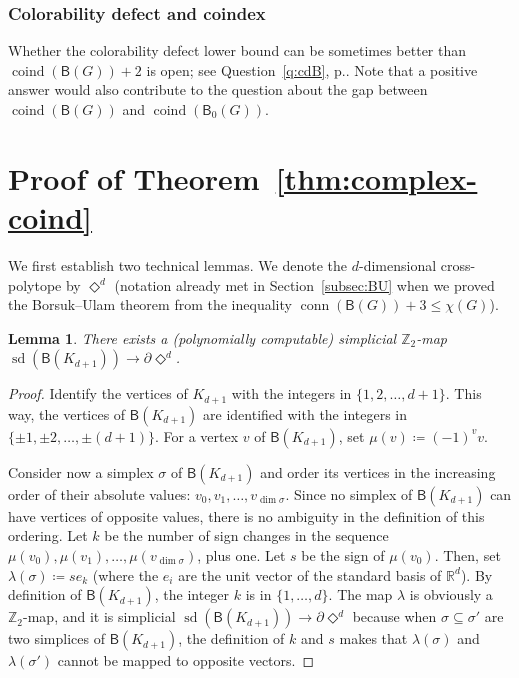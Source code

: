 \documentclass[12pt]{amsart}
\newtheorem{lemma}[theorem]{Lemma}
\theoremstyle{definition}
\def\R{\mathbb{R}}
\def\Z{\mathbb{Z}}
\def\B{\mathsf{B}}
\renewcommand{\leq}{\leqslant}
\def\conn{\operatorname{conn}}
\def\coind{\operatorname{coind}}
\def\sd{\operatorname{sd}}
\begin{document}
\subsubsection*{Colorability defect and coindex} Whether the colorability defect lower bound can be sometimes better than $\coind(\B(G))+2$ is open; see Question~\ref{q:cdB}, p.\pageref{page:cdB}. Note that a positive answer would also contribute to the question about the gap between $\coind(\B(G))$ and $\coind(\B_0(G))$.











\appendix

\section{Proof of Theorem~\ref{thm:complex-coind}}

We first establish two technical lemmas. We denote the $d$-dimensional cross-polytope by $\Diamond^d$ (notation already met in Section~\ref{subsec:BU} when we proved the Borsuk--Ulam theorem from the inequality $\conn(\B(G))+3\leq\chi(G)$).

\begin{lemma}\label{lem:bk}
There exists a (polynomially computable) simplicial $\Z_2$-map $\sd(\B(K_{d+1})) \rightarrow \partial \Diamond^d$. 
\end{lemma}

\begin{proof}
    Identify the vertices of $K_{d+1}$ with the integers in $\{1,2,\ldots,d+1\}$. This way, the vertices of $\B(K_{d+1})$ are identified with the integers in $\{\pm 1,\pm 2,\ldots,\pm (d+1)\}$. For a vertex $v$ of $\B(K_{d+1})$, set $\mu(v) \coloneqq (-1)^vv$.

    Consider now a simplex $\sigma$ of $\B(K_{d+1})$ and order its vertices in the increasing order of their absolute values: $v_0,v_1,\ldots,v_{\dim\sigma}$. Since no simplex of $\B(K_{d+1})$ can have vertices of opposite values, there is no ambiguity in the definition of this ordering. Let $k$ be the number of sign changes in the sequence $\mu(v_0),\mu(v_1),\ldots,\mu(v_{\dim\sigma})$, plus one. Let $s$ be the sign of $\mu(v_0)$. Then, set $\lambda(\sigma)\coloneqq s e_k$ (where the $e_i$ are the unit vector of the standard basis of $\R^d$). By definition of $\B(K_{d+1})$, the integer $k$ is in $\{1,\ldots,d\}$. The map $\lambda$ is obviously a $\Z_2$-map, and it is simplicial $\sd(\B(K_{d+1})) \rightarrow \partial \Diamond^d$ because when $\sigma \subseteq \sigma'$ are two simplices of $\B(K_{d+1})$, the definition of $k$ and $s$ makes that $\lambda(\sigma)$ and $\lambda(\sigma')$ cannot be mapped to opposite vectors.
\end{proof}
\end{document}
